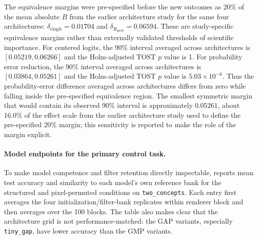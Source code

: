 The equivalence margins were pre-specified before the new outcomes as 20\% of the mean absolute $B$ from the earlier architecture study for the same four architectures: $\delta_{\mathrm{clogit}}=0.01704$ and $\delta_{R_{\mathrm{prob}}}=0.06594$. These are study-specific equivalence margins rather than externally validated thresholds of scientific importance. For centered logits, the 90\% interval averaged across architectures is $[0.05219,0.06266]$ and the Holm-adjusted TOST $p$ value is 1. For probability error reduction, the 90\% interval averaged across architectures is $[0.03864,0.05261]$ and the Holm-adjusted TOST $p$ value is $5.03\times10^{-6}$. Thus the probability-error difference averaged across architectures differs from zero while falling inside the pre-specified equivalence region. The smallest symmetric margin that would contain its observed 90\% interval is approximately $0.05261$, about 16.0\% of the effect scale from the earlier architecture study used to define the pre-specified 20\% margin; this sensitivity is reported to make the role of the margin explicit.

\paragraph{Model endpoints for the primary control task.}
To make model competence and filter retention directly inspectable,  reports mean test accuracy and similarity to each model's own reference bank for the structured and pixel-permuted conditions on \texttt{two\_concepts}. Each entry first averages the four initialization/filter-bank replicates within renderer block and then averages over the 100 blocks. The table also makes clear that the architecture grid is not performance-matched: the GAP variants, especially \texttt{tiny\_gap}, have lower accuracy than the GMP variants.

